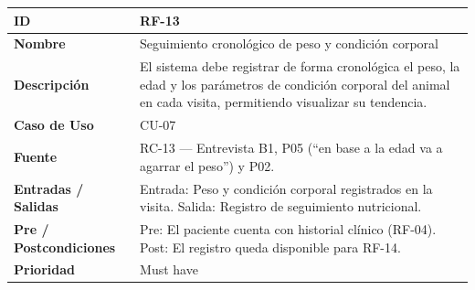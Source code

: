 \documentclass[
]{article}
\newcounter{none} %
\begin{document}
{\def\LTcaptype{none} %
\begin{longtable}[]{|
  >{\raggedright\arraybackslash}p{}|
  >{\raggedright\arraybackslash}p{}|}
\hline
\begin{minipage}[b]{\linewidth}\raggedright
\textbf{ID}
\end{minipage} & \begin{minipage}[b]{\linewidth}\raggedright
RF-13
\end{minipage} \\
\hline
\endhead
\hline
\endlastfoot
\textbf{Nombre} & \begin{minipage}[t]{\linewidth}\raggedright
Seguimiento cronológico de peso y condición corporal
\end{minipage} \\
\hline
\textbf{Descripción} & \begin{minipage}[t]{\linewidth}\raggedright
El sistema debe registrar de forma cronológica el peso, la edad y los parámetros de condición corporal del animal en cada visita, permitiendo visualizar su tendencia.
\end{minipage} \\
\hline
\textbf{Caso de Uso} & \begin{minipage}[t]{\linewidth}\raggedright
CU-07
\end{minipage} \\
\hline
\textbf{Fuente} & \begin{minipage}[t]{\linewidth}\raggedright
RC-13 — Entrevista B1, P05 (“en base a la edad va a agarrar el peso”) y P02.
\end{minipage} \\
\hline
\textbf{Entradas / Salidas} & \begin{minipage}[t]{\linewidth}\raggedright
Entrada: Peso y condición corporal registrados en la visita. Salida: Registro de seguimiento nutricional.
\end{minipage} \\
\hline
\textbf{Pre / Postcondiciones} & \begin{minipage}[t]{\linewidth}\raggedright
Pre: El paciente cuenta con historial clínico (RF-04). Post: El registro queda disponible para RF-14.
\end{minipage} \\
\hline
\textbf{Prioridad} & \begin{minipage}[t]{\linewidth}\raggedright
Must have
\end{minipage} \\

\end{longtable}}
\end{document}
